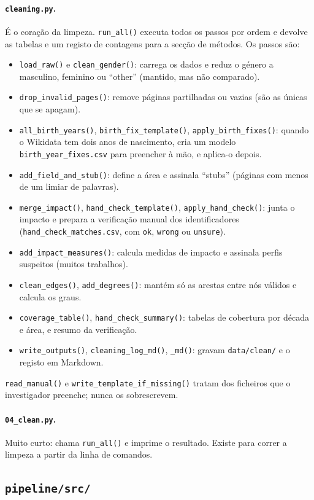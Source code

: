\documentclass[11pt,a4paper]{article}
\newcommand{\file}[1]{\texttt{#1}}
\newcommand{\fn}[1]{\texttt{#1()}}
\begin{document}
\paragraph{\file{cleaning.py}.} É o coração da limpeza. \fn{run_all} executa todos os passos por ordem e devolve as tabelas e um registo de contagens para a secção de métodos. Os passos são:
\begin{itemize}
  \item \fn{load_raw} e \fn{clean_gender}: carrega os dados e reduz o género a masculino, feminino ou ``other'' (mantido, mas não comparado).
  \item \fn{drop_invalid_pages}: remove páginas partilhadas ou vazias (são as únicas que se apagam).
  \item \fn{all_birth_years}, \fn{birth_fix_template}, \fn{apply_birth_fixes}: quando o Wikidata tem dois anos de nascimento, cria um modelo \file{birth_year_fixes.csv} para preencher à mão, e aplica-o depois.
  \item \fn{add_field_and_stub}: define a área e assinala ``stubs'' (páginas com menos de um limiar de palavras).
  \item \fn{merge_impact}, \fn{hand_check_template}, \fn{apply_hand_check}: junta o impacto e prepara a verificação manual dos identificadores (\file{hand_check_matches.csv}, com \texttt{ok}, \texttt{wrong} ou \texttt{unsure}).
  \item \fn{add_impact_measures}: calcula medidas de impacto e assinala perfis suspeitos (muitos trabalhos).
  \item \fn{clean_edges}, \fn{add_degrees}: mantém só as arestas entre nós válidos e calcula os graus.
  \item \fn{coverage_table}, \fn{hand_check_summary}: tabelas de cobertura por década e área, e resumo da verificação.
  \item \fn{write_outputs}, \fn{cleaning_log_md}, \fn{_md}: gravam \file{data/clean/} e o registo em Markdown.
\end{itemize}
\fn{read_manual} e \fn{write_template_if_missing} tratam dos ficheiros que o investigador preenche; nunca os sobrescrevem.

\paragraph{\file{04_clean.py}.} Muito curto: chama \fn{run_all} e imprime o resultado. Existe para correr a limpeza a partir da linha de comandos.

\subsection{\file{pipeline/src/}}
\end{document}
